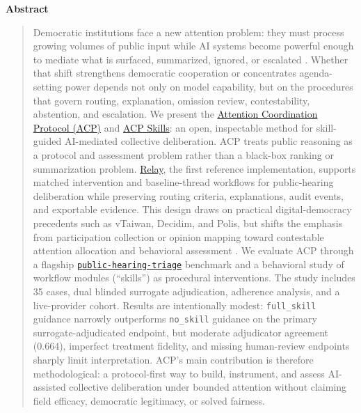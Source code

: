 \documentclass[11pt]{article}
\begin{document}
\begin{center}
{\large\bfseries Abstract}
\end{center}
\vspace{0.12in}
\begin{quote}
Democratic institutions face a new attention problem: they must process growing volumes of public input while AI systems become powerful enough to mediate what is surfaced, summarized, ignored, or escalated \cite{Dafoe2020OpenProblems,Ulnicane2024Governance}. Whether that shift strengthens democratic cooperation or concentrates agenda-setting power depends not only on model capability, but on the procedures that govern routing, explanation, omission review, contestability, abstention, and escalation. We present the \href{https://github.com/davidkimai/acp/tree/main/protocol}{Attention Coordination Protocol (ACP)} and \href{https://github.com/davidkimai/acp/tree/main/skills}{ACP Skills}: an open, inspectable method for skill-guided AI-mediated collective deliberation. ACP treats public reasoning as a protocol and assessment problem rather than a black-box ranking or summarization problem. \href{https://github.com/davidkimai/acp/blob/main/docs/specs/RELAY_REFERENCE_IMPLEMENTATION_SPEC.md}{Relay}, the first reference implementation, supports matched intervention and baseline-thread workflows for public-hearing deliberation while preserving routing criteria, explanations, audit events, and exportable evidence. This design draws on practical digital-democracy precedents such as vTaiwan, Decidim, and Polis, but shifts the emphasis from participation collection or opinion mapping toward contestable attention allocation and behavioral assessment \cite{Hsiao2018vTaiwan,Aragon2017Decidim,Small2021Polis}. We evaluate ACP through a flagship \href{https://github.com/davidkimai/acp/tree/main/benchmarks/scenarios/public-hearing-triage}{\texttt{public-hearing-triage}} benchmark and a behavioral study of workflow modules (``skills'') as procedural interventions. The study includes 35 cases, dual blinded surrogate adjudication, adherence analysis, and a live-provider cohort. Results are intentionally modest: \texttt{full\_skill} guidance narrowly outperforms \texttt{no\_skill} guidance on the primary surrogate-adjudicated endpoint, but moderate adjudicator agreement (0.664), imperfect treatment fidelity, and missing human-review endpoints sharply limit interpretation. ACP's main contribution is therefore methodological: a protocol-first way to build, instrument, and assess AI-assisted collective deliberation under bounded attention without claiming field efficacy, democratic legitimacy, or solved fairness.
\end{quote}
\end{document}

